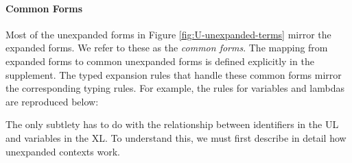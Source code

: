 \documentclass[acmsmall,10pt,review,anonymous]{acmart}\settopmatter{printfolios=true}
\begin{document}

\paragraph{Common Forms} Most of the unexpanded forms in Figure \ref{fig:U-unexpanded-terms}  mirror the expanded forms. We refer to these as the \emph{common forms}. The mapping from expanded forms to common unexpanded forms is defined explicitly in the supplement. 
The typed expansion rules that handle these common forms mirror the corresponding typing rules. For example, the rules for variables and lambdas are reproduced below:
\begin{mathpar}

\end{mathpar}

The only subtlety has to do with the relationship between identifiers in the UL and variables in the XL. To understand this, we must first describe in detail how unexpanded contexts work.
\end{document}
